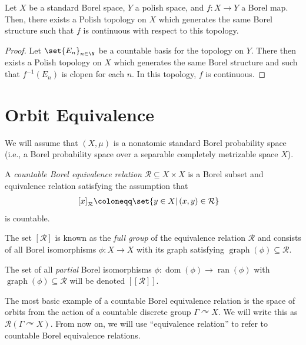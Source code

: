 \documentclass[10pt]{mypackage}
\renewcommand{\coloneq}{\coloneqq}
\begin{document}
\begin{corollary}
  Let $X$ be a standard Borel space, $Y$ a polish space, and $f\colon X\rightarrow Y$ a Borel map. Then, there exists a Polish topology on $X$ which generates the same Borel structure such that $f$ is continuous with respect to this topology.
\end{corollary}
\begin{proof}
  Let $\set{E_n}_{n\in \N}$ be a countable basis for the topology on $Y$. There then exists a Polish topology on $X$ which generates the same Borel structure and such that $f^{-1}\left( E_n \right)$ is clopen for each $n$. In this topology, $f$ is continuous.
\end{proof}
\section{Orbit Equivalence}%
We will assume that $\left( X,\mu \right)$ is a nonatomic standard Borel probability space (i.e., a Borel probability space over a separable completely metrizable space $X$).
\begin{definition}
  A \textit{countable Borel equivalence relation} $\mathcal{R}\subseteq X\times X$ is a Borel subset and equivalence relation satisfying the assumption that
  \begin{align*}
    \left[ x \right]_{\mathcal{R}} &\coloneq \set{y\in X | \left( x,y \right)\in \mathcal{R}} 
  \end{align*}
  is countable.
\end{definition}
The set $\left[ \mathcal{R} \right]$ is known as the \textit{full group} of the equivalence relation $\mathcal{R}$ and consists of all Borel isomorphisms $\phi\colon X\rightarrow X$ with its graph satisfying $\operatorname{graph}\left(\phi\right)\subseteq \mathcal{R}$.

The set of all \textit{partial} Borel isomorphisms $\phi\colon \operatorname{dom}\left( \phi \right)\rightarrow \operatorname{ran}\left( \phi \right)$ with $\operatorname{graph}\left( \phi \right)\subseteq \mathcal{R}$ will be denoted $\left[ \left[ \mathcal{R} \right] \right]$.

The most basic example of a countable Borel equivalence relation is the space of orbits from the action of a countable discrete group $\Gamma\curvearrowright X$. We will write this as $\mathcal{R}\left( \Gamma\curvearrowright X \right)$. From now on, we will use ``equivalence relation'' to refer to countable Borel equivalence relations.
\end{document}
